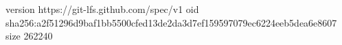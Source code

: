 version https://git-lfs.github.com/spec/v1
oid sha256:a2f51296d9baf1bb5500cfed13de2da3d7ef159597079ec6224eeb5dea6e8607
size 262240

